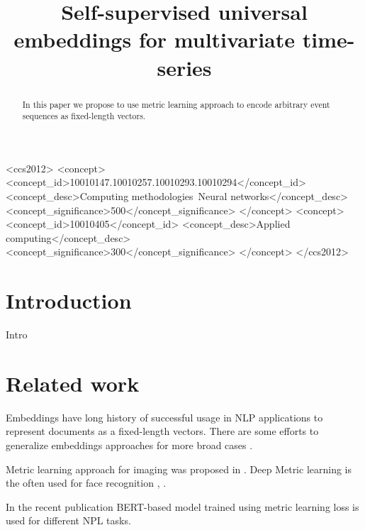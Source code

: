 \documentclass[sigconf]{acmart}
\begin{document}
\title{Self-supervised universal embeddings for multivariate time-series}


\begin{abstract}

In this paper we propose to use metric learning approach to encode arbitrary event sequences as fixed-length vectors.

\end{abstract}

\begin{CCSXML}
<ccs2012>
<concept>
<concept_id>10010147.10010257.10010293.10010294</concept_id>
<concept_desc>Computing methodologies~Neural networks</concept_desc>
<concept_significance>500</concept_significance>
</concept>
<concept>
<concept_id>10010405</concept_id>
<concept_desc>Applied computing</concept_desc>
<concept_significance>300</concept_significance>
</concept>
</ccs2012>
\end{CCSXML}



\maketitle

\section{Introduction}

Intro

\section{Related work} \label{sec-rw}

Embeddings have long history of successful usage in NLP applications to represent documents as a fixed-length vectors. There are some efforts to generalize embeddings approaches for more broad cases \cite{Wu2017StarSpaceEA}.

Metric learning approach for imaging was proposed in \cite{Hadsell:2006:DRL:1153171.1153654}.
Deep Metric learning is the often used for face recognition \cite{Schroff2015FaceNetAU}, \cite{kaya2019deep}.

In the recent publication \cite{reimers-2019-sentence-bert} BERT-based model \cite{Devlin2019BERTPO} trained using metric learning loss is used for different NPL tasks.
\end{document}
